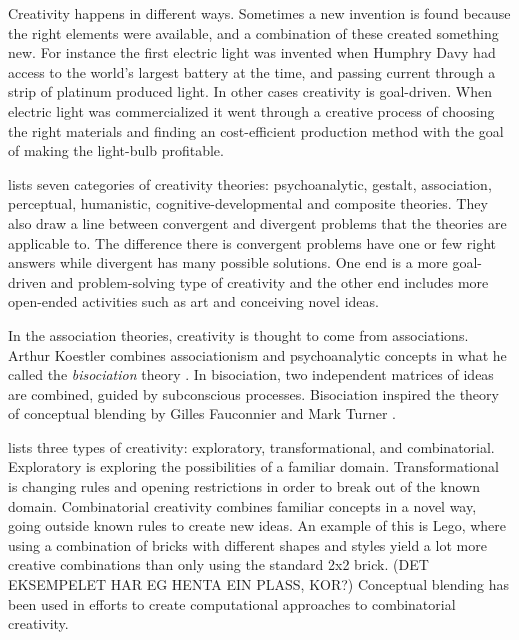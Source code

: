 Creativity happens in different ways. Sometimes a new invention is found because the right elements were available, and a combination of these created something new. For instance the first electric light was invented when Humphry Davy had access to the world's largest battery at the time, and passing current through a strip of platinum produced light. In other cases creativity is goal-driven. When electric light was commercialized it went through a creative process of choosing the right materials and finding an cost-efficient production method with the goal of making the light-bulb profitable.

\citet{busse1980theories} lists seven categories of creativity theories: psychoanalytic, gestalt, association, perceptual, humanistic, cognitive-developmental and composite theories.
They also draw a line between convergent and divergent problems that the theories are applicable to. The difference there is convergent problems have one or few right answers while divergent has many possible solutions. One end is a more goal-driven and problem-solving type of creativity and the other end includes more open-ended activities such as art and conceiving novel ideas.

In the association theories, creativity is thought to come from associations. Arthur Koestler combines associationism and psychoanalytic concepts in what he called the \emph{bisociation} theory \parencite{busse1980theories}. In bisociation, two independent matrices of ideas are combined, guided by subconscious processes. Bisociation inspired the theory of conceptual blending by Gilles Fauconnier and Mark Turner \parencite{fauconnier2002way}.

\citet{boden2004creative} lists three types of creativity: exploratory, transformational, and combinatorial. Exploratory is exploring the possibilities of a familiar domain. Transformational is changing rules and opening restrictions in order to break out of the known domain. Combinatorial creativity combines familiar concepts in a novel way, going outside known rules to create new ideas. An example of this is Lego, where using a combination of bricks with different shapes and styles yield a lot more creative combinations than only using the standard 2x2 brick. (DET EKSEMPELET HAR EG HENTA EIN PLASS, KOR?) Conceptual blending has been used in efforts to create computational approaches to combinatorial creativity.

